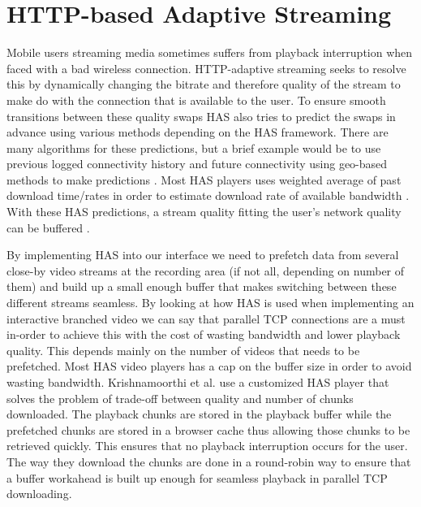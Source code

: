 \section{HTTP-based Adaptive Streaming}
\label{sec:has}

Mobile users streaming media sometimes suffers from playback interruption when faced with a bad wireless connection. HTTP-adaptive streaming seeks to resolve this by dynamically changing the bitrate and therefore quality of the stream to make do with the connection that is available to the user. To ensure smooth transitions between these quality swaps HAS also tries to predict the swaps in advance using various methods depending on the HAS framework. There are many algorithms for these predictions, but a brief example would be to use previous logged connectivity history and future connectivity using geo-based methods to make predictions \cite{gtube}. Most HAS players uses weighted average of past download time/rates in order to estimate download rate of available bandwidth \cite{qualbranch}. With these HAS predictions, a stream quality fitting the user’s network quality can be buffered \cite{gtube}.

By implementing HAS into our interface we need to prefetch data from several close-by video streams at the recording area (if not all, depending on number of them) and build up a small enough buffer that makes switching between these different streams seamless. By looking at how HAS is used when implementing an interactive branched video we can say that parallel TCP connections are a must in-order to achieve this with the cost of wasting bandwidth and lower playback quality. This depends mainly on the number of videos that needs to be prefetched. Most HAS video players has a cap on the buffer size in order to avoid wasting bandwidth. Krishnamoorthi et al. \cite{qualbranch} use a customized HAS player that solves the problem of trade-off between quality and number of chunks downloaded. The playback chunks are stored in the playback buffer while the prefetched chunks are stored in a browser cache thus allowing those chunks to be retrieved quickly. This ensures that no playback interruption occurs for the user. The way they download the chunks are done in a round-robin way to ensure that a buffer workahead is built up enough for seamless playback in parallel TCP downloading. 

